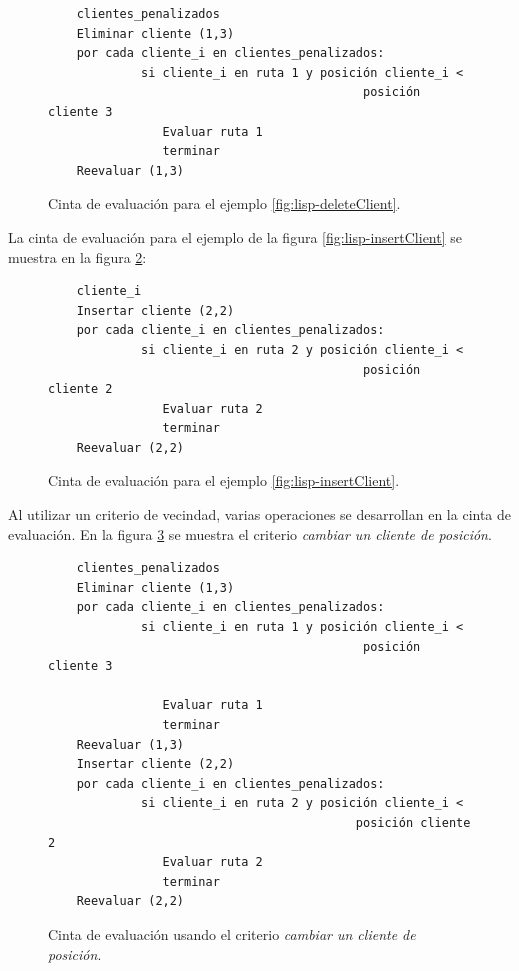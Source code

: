 \begin{figure}[h!]
    \begin{verbatim} 
    clientes_penalizados 
    Eliminar cliente (1,3)
    por cada cliente_i en clientes_penalizados:
             si cliente_i en ruta 1 y posición cliente_i <
                                            posición cliente 3
                Evaluar ruta 1
                terminar
    Reevaluar (1,3)
    \end{verbatim}
    \caption{Cinta de evaluación para el ejemplo \ref{fig:lisp-deleteClient}.\label{tape-delete-client}}
  \end{figure}


La cinta de evaluación para el ejemplo de la figura \ref{fig:lisp-insertClient} se muestra en la figura \ref{tape-insert-client}:

\begin{figure}[h!]
    \begin{verbatim} 
    cliente_i
    Insertar cliente (2,2)
    por cada cliente_i en clientes_penalizados:
             si cliente_i en ruta 2 y posición cliente_i <
                                            posición cliente 2
                Evaluar ruta 2
                terminar
    Reevaluar (2,2)
\end{verbatim}
\caption{Cinta de evaluación para el ejemplo \ref{fig:lisp-insertClient}.\label{tape-insert-client}}
\end{figure}

Al utilizar un criterio de vecindad, varias operaciones se desarrollan en la cinta de evaluación. En la figura \ref{tape-move-client} se muestra el criterio \textit{cambiar un cliente de posición}.

\begin{figure}[h!]
    \begin{verbatim} 
    clientes_penalizados 
    Eliminar cliente (1,3)
    por cada cliente_i en clientes_penalizados:
             si cliente_i en ruta 1 y posición cliente_i <
                                            posición cliente 3
                                                        
                Evaluar ruta 1
                terminar
    Reevaluar (1,3)
    Insertar cliente (2,2)
    por cada cliente_i en clientes_penalizados:
             si cliente_i en ruta 2 y posición cliente_i < 
                                           posición cliente 2
                Evaluar ruta 2
                terminar
    Reevaluar (2,2)
    \end{verbatim}
    \caption{Cinta de evaluación usando el criterio \textit{cambiar un cliente de posición}.\label{tape-move-client}}
  \end{figure}

